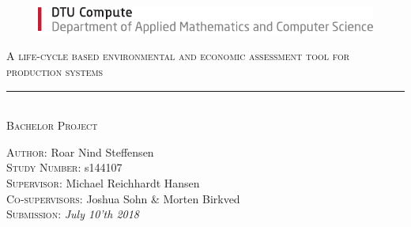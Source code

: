 \begin{figure}[H]
    \includegraphics{.Figures/DTU-Compute.pdf}
\end{figure} 

\vspace{5 cm}
\begin{center}
    \Large
    \textsc{A life-cycle based environmental and economic assessment tool for production systems} \\
    \vspace{3mm}
    \large
    \noindent\rule{10cm}{0.4px}\\
    \textsc{Bachelor Project}\\
\end{center}

\vfill
\large
\textsc{Author:} Roar Nind Steffensen\\
\textsc{Study Number:} s144107\vspace{5mm}\\
\textsc{Supervisor:} Michael Reichhardt Hansen\\
\textsc{Co-supervisors:} Joshua Sohn \& Morten Birkved\vspace{5mm}\\
\textsc{Submission:} \textit{July 10'th 2018}
